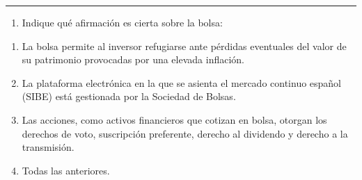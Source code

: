 \documentclass[
  letterpaper,
  DIV=11,
  numbers=noendperiod]{scrreprt}
\providecommand{\tightlist}{%
  \setlength{\itemsep}{0pt}\setlength{\parskip}{0pt}}\usepackage{longtable,booktabs,array}
\begin{document}
\begin{center}\rule{0.5\linewidth}{0.5pt}\end{center}

\begin{enumerate}
\def\labelenumi{\arabic{enumi}.}
\setcounter{enumi}{10}
\tightlist
\item
  Indique qué afirmación es cierta sobre la bolsa:
\end{enumerate}

\begin{enumerate}
\def\labelenumi{\alph{enumi})}
\item
  La bolsa permite al inversor refugiarse ante pérdidas eventuales del
  valor de su patrimonio provocadas por una elevada inflación.
\item
  La plataforma electrónica en la que se asienta el mercado continuo
  español (SIBE) está gestionada por la Sociedad de Bolsas.
\item
  Las acciones, como activos financieros que cotizan en bolsa, otorgan
  los derechos de voto, suscripción preferente, derecho al dividendo y
  derecho a la transmisión.
\item
  Todas las anteriores.
\end{enumerate}
\end{document}
